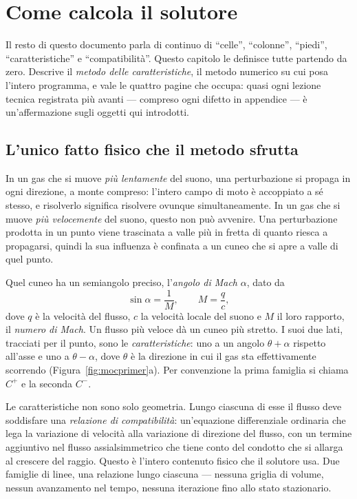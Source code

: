 \chapter{Come calcola il solutore}
\label{ch:moc}

Il resto di questo documento parla di continuo di ``celle'',
``colonne'', ``piedi'', ``caratteristiche'' e ``compatibilità''.
Questo capitolo le definisce tutte partendo da zero. Descrive il
\emph{metodo delle caratteristiche}, il metodo numerico su cui posa
l'intero programma, e vale le quattro pagine che occupa: quasi ogni
lezione tecnica registrata più avanti --- compreso ogni difetto in
appendice --- è un'affermazione sugli oggetti qui introdotti.

\section{L'unico fatto fisico che il metodo sfrutta}

In un gas che si muove \emph{più lentamente} del suono, una
perturbazione si propaga in ogni direzione, a monte compreso:
l'intero campo di moto è accoppiato a sé stesso, e risolverlo
significa risolvere ovunque simultaneamente. In un gas che si muove
\emph{più velocemente} del suono, questo non può avvenire. Una
perturbazione prodotta in un punto viene trascinata a valle più in
fretta di quanto riesca a propagarsi, quindi la sua influenza è
confinata a un cuneo che si apre a valle di quel punto.

Quel cuneo ha un semiangolo preciso, l'\emph{angolo di Mach}
$\alpha$, dato da
\begin{equation}
\sin\alpha = \frac{1}{M}, \qquad M = \frac{q}{c},
\label{eq:machangle}
\end{equation}
dove $q$ è la velocità del flusso, $c$ la velocità locale del suono
e $M$ il loro rapporto, il \emph{numero di Mach}. Un flusso più
veloce dà un cuneo più stretto. I suoi due lati, tracciati per il
punto, sono le \emph{caratteristiche}: uno a un angolo
$\theta + \alpha$ rispetto all'asse e uno a $\theta - \alpha$, dove
$\theta$ è la direzione in cui il gas sta effettivamente scorrendo
(Figura~\ref{fig:mocprimer}a). Per convenzione la prima famiglia si
chiama $C^{+}$ e la seconda $C^{-}$.

Le caratteristiche non sono solo geometria. Lungo ciascuna di esse
il flusso deve soddisfare una \emph{relazione di compatibilità}:
un'equazione differenziale ordinaria che lega la variazione di
velocità alla variazione di direzione del flusso, con un termine
aggiuntivo nel flusso assialsimmetrico che tiene conto del condotto
che si allarga al crescere del raggio. Questo è l'intero contenuto
fisico che il solutore usa. Due famiglie di linee, una relazione
lungo ciascuna --- nessuna griglia di volume, nessun avanzamento nel
tempo, nessuna iterazione fino allo stato stazionario.

